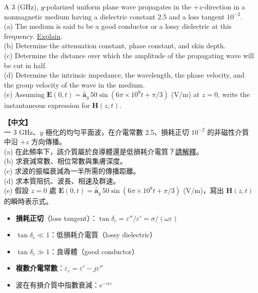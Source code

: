\documentclass[12pt,a4paper]{article}
\newcommand{\vE}{\mathbf{E}}
\newcommand{\vH}{\mathbf{H}}
\newcommand{\ay}{\hat{\mathbf{a}}_y}
\begin{document}
\begin{questionbox}
A 3 (GHz), $y$-polarized uniform plane wave propagates in the $+z$-direction in a nonmagnetic medium having a dielectric constant 2.5 and a loss tangent $10^{-2}$.\\
(a) The medium is said to be a good conductor or a lossy dielectric at this frequency. \underline{Explain}.\\
(b) Determine the attenuation constant, phase constant, and skin depth.\\
(c) Determine the distance over which the amplitude of the propagating wave will be cut in half.\\
(d) Determine the intrinsic impedance, the wavelength, the phase velocity, and the group velocity of the wave in the medium.\\
(e) Assuming $\vE(0,t) = \ay\,50\sin(6\pi\times10^9 t + \pi/3)$ (V/m) at $z=0$, write the instantaneous expression for $\vH(z,t)$.

\medskip\noindent\textbf{【中文】}\\
一 3 GHz、$y$ 極化的均勻平面波，在介電常數 2.5、損耗正切 $10^{-2}$ 的非磁性介質中沿 $+z$ 方向傳播。\\
(a) 在此頻率下，該介質屬於良導體還是低損耗介電質？\underline{請解釋}。\\
(b) 求衰減常數、相位常數與集膚深度。\\
(c) 求波的振幅衰減為一半所需的傳播距離。\\
(d) 求本質阻抗、波長、相速及群速。\\
(e) 假設 $z=0$ 處 $\vE(0,t) = \ay\,50\sin(6\pi\times10^9 t + \pi/3)$ (V/m)，寫出 $\vH(z,t)$ 的瞬時表示式。
\end{questionbox}

\begin{conceptbox}[核心概念]
\begin{itemize}
  \item \textbf{損耗正切}（loss tangent）：$\tan\delta_c = \varepsilon''/\varepsilon' = \sigma/(\omega\varepsilon)$
  \item $\tan\delta_c \ll 1$：低損耗介電質（lossy dielectric）
  \item $\tan\delta_c \gg 1$：良導體（good conductor）
  \item \textbf{複數介電常數}：$\varepsilon_c = \varepsilon' - j\varepsilon''$
  \item 波在有損介質中指數衰減：$e^{-\alpha z}$
\end{itemize}
\end{conceptbox}
\end{document}
